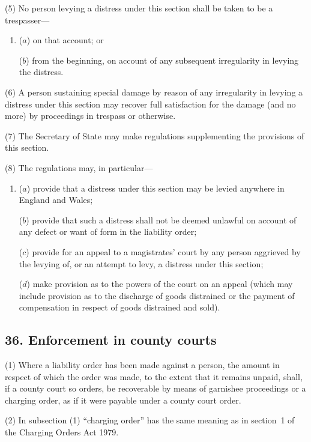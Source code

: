 \documentclass[12pt,a4paper]{article}
\begin{document}
(5) No person levying a distress under this section shall be taken to be a trespasser—
\begin{enumerate}\item[]
($a$) on that account; or

($b$) from the beginning, on account of any subsequent irregularity in levying the distress.
\end{enumerate}

(6) A person sustaining special damage by reason of any irregularity in levying a distress under this section may recover full satisfaction for the damage (and no more) by proceedings in trespass or otherwise.

(7) The Secretary of State may make regulations supplementing the provisions of this section.

(8) The regulations may, in particular—
\begin{enumerate}\item[]
($a$) provide that a distress under this section may be levied anywhere in England and Wales;

($b$) provide that such a distress shall not be deemed unlawful on account of any defect or want of form in the liability order;

($c$) provide for an appeal to a magistrates' court by any person aggrieved by the levying of, or an attempt to levy, a distress under this section;

($d$) make provision as to the powers of the court on an appeal (which may include provision as to the discharge of goods distrained or the payment of compensation in respect of goods distrained and sold).
\end{enumerate}


\subsection{36. Enforcement in county courts}

(1) Where a liability order has been made against a person, the amount in respect of which the order was made, to the extent that it remains unpaid, shall, if a county court so orders, be recoverable by means of garnishee proceedings or a charging order, as if it were payable under a county court order.

(2) In subsection (1)  “charging order” has the same meaning as in section~1 of the Charging Orders Act 1979.
\end{document}
